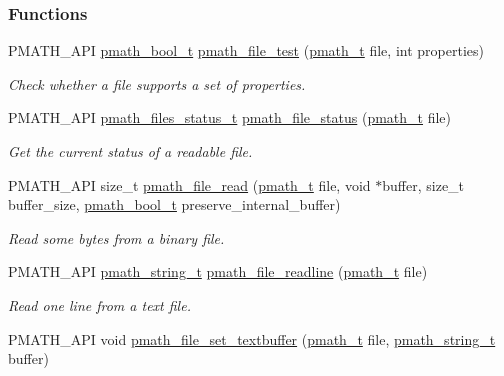 \subsubsection*{Functions}
\begin{CompactItemize}
\item 
PMATH\_\-API \hyperlink{group__general__types_gc92090cb0b56345d6c379ed2341d4ef4}{pmath\_\-bool\_\-t} \hyperlink{group__file__api_gacadb911c98d75248cbcf4fbe5a3237a}{pmath\_\-file\_\-test} (\hyperlink{classpmath__t}{pmath\_\-t} file, int properties)
\begin{CompactList}\small\item\em Check whether a file supports a set of properties. \item\end{CompactList}\item 
PMATH\_\-API \hyperlink{group__file__api_g1fa07caf59a04495b7c74be6aff3a3d9}{pmath\_\-files\_\-status\_\-t} \hyperlink{group__file__api_gc3e849245672e6b61ee1a447218d5ea5}{pmath\_\-file\_\-status} (\hyperlink{classpmath__t}{pmath\_\-t} file)
\begin{CompactList}\small\item\em Get the current status of a readable file. \item\end{CompactList}\item 
PMATH\_\-API size\_\-t \hyperlink{group__file__api_g045e5eeb1b78c481c5479fc52ba3a402}{pmath\_\-file\_\-read} (\hyperlink{classpmath__t}{pmath\_\-t} file, void $\ast$buffer, size\_\-t buffer\_\-size, \hyperlink{group__general__types_gc92090cb0b56345d6c379ed2341d4ef4}{pmath\_\-bool\_\-t} preserve\_\-internal\_\-buffer)
\begin{CompactList}\small\item\em Read some bytes from a binary file. \item\end{CompactList}\item 
PMATH\_\-API \hyperlink{classpmath__string__t}{pmath\_\-string\_\-t} \hyperlink{group__file__api_gfe0826b3bb3e06907074976c57a67dbf}{pmath\_\-file\_\-readline} (\hyperlink{classpmath__t}{pmath\_\-t} file)
\begin{CompactList}\small\item\em Read one line from a text file. \item\end{CompactList}\item 
PMATH\_\-API void \hyperlink{group__file__api_g84c177ddfd1eeaa2b8b5fd5aafbf16a1}{pmath\_\-file\_\-set\_\-textbuffer} (\hyperlink{classpmath__t}{pmath\_\-t} file, \hyperlink{classpmath__string__t}{pmath\_\-string\_\-t} buffer)

\end{CompactItemize}
